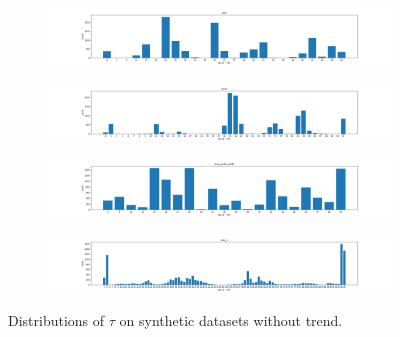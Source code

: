 \begin{figure}[ht]
    \centering
    \begin{subfigure}{\textwidth}
        \includegraphics[width=\textwidth]{img/tau_sinx.png}
    \end{subfigure}
    \begin{subfigure}{\textwidth}
        \includegraphics[width=\textwidth]{img/tau_xsinx.png}
    \end{subfigure}
    \begin{subfigure}{\textwidth}
        \includegraphics[width=\textwidth]{img/tau_sinx_sin2x_sin4x.png}
    \end{subfigure}
    \begin{subfigure}{\textwidth}
        \includegraphics[width=\textwidth]{img/tau_sinx_c.png}
    \end{subfigure}
    \caption{Distributions of $\tau$ on synthetic datasets without trend.}
\end{figure}
